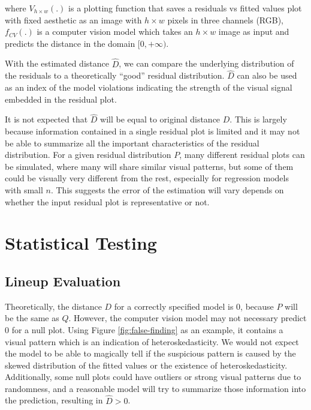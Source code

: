 \documentclass[]{interact}
\theoremstyle{plain}%
\theoremstyle{definition}
\theoremstyle{remark}
\begin{document}
\noindent where \(V_{h \times w}(.)\) is a plotting function that saves
a residuals vs fitted values plot with fixed aesthetic as an image with
\(h \times w\) pixels in three channels (RGB), \(f_{CV}(.)\) is a
computer vision model which takes an \(h \times w\) image as input and
predicts the distance in the domain \([0, +\infty)\).

With the estimated distance \(\hat{D}\), we can compare the underlying
distribution of the residuals to a theoretically ``good'' residual
distribution. \(\hat{D}\) can also be used as an index of the model
violations indicating the strength of the visual signal embedded in the
residual plot.

It is not expected that \(\hat{D}\) will be equal to original distance
\(D\). This is largely because information contained in a single
residual plot is limited and it may not be able to summarize all the
important characteristics of the residual distribution. For a given
residual distribution \(P\), many different residual plots can be
simulated, where many will share similar visual patterns, but some of
them could be visually very different from the rest, especially for
regression models with small \(n\). This suggests the error of the
estimation will vary depends on whether the input residual plot is
representative or not.

\section{Statistical Testing}\label{sec-model-statistical-testing}

\subsection{Lineup Evaluation}\label{sec-model-lineup-evaluation}

Theoretically, the distance \(D\) for a correctly specified model is
\(0\), because \(P\) will be the same as \(Q\). However, the computer
vision model may not necessary predict \(0\) for a null plot. Using
Figure \ref{fig:false-finding} as an example, it contains a visual
pattern which is an indication of heteroskedasticity. We would not
expect the model to be able to magically tell if the suspicious pattern
is caused by the skewed distribution of the fitted values or the
existence of heteroskedasticity. Additionally, some null plots could
have outliers or strong visual patterns due to randomness, and a
reasonable model will try to summarize those information into the
prediction, resulting in \(\hat{D} > 0\).
\end{document}
